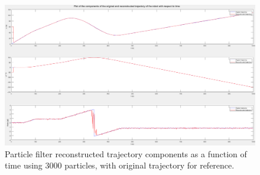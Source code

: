 \begin{figure}
    \centering
    \includegraphics[width=\columnwidth]{images/pf_subplot.png}
    \caption{Particle filter reconstructed trajectory components as a function of time using 3000 particles, with original trajectory for reference.}
    \label{fig:pf_subplot}
\end{figure}


